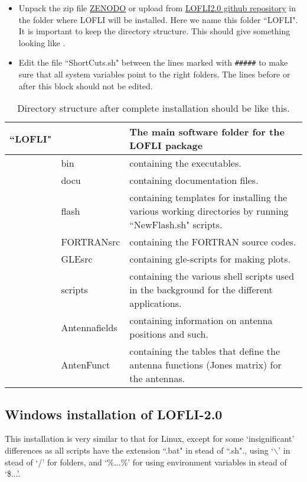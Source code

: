 \begin{itemize}
\item Unpack the zip file  \href{https://zenodo.org/records/7393903}{ZENODO} or upload from  \href{https://github.com/OlafScholten/LOFLI/tree/LOFLI2.0}{LOFLI2.0 github repository} in the folder where LOFLI will be installed. Here we name this folder ``LOFLI". It is important to keep the directory structure. This should give something looking like .
\item Edit the file ``ShortCuts.sh" between the lines marked with {\small \verb!#####! } to make sure that all system variables point to the right folders. The lines before or after this block should not be edited.
\end{itemize}

\begin{table}[!ht]
\caption{Directory structure after complete installation should be like this. }
\begin{tabular}{|l l | p{10cm}|}
\hline
{``LOFLI"} & &\multicolumn{1}{|l||}{The main software folder for the LOFLI package} \\
\hline
   & bin & containing the executables. \\
   & docu &  containing documentation files. \\
   & flash & containing templates for installing the various working directories by running ``NewFlash.sh" scripts. \\
   & FORTRANsrc & containing the FORTRAN source codes. \\
   & GLEsrc &  containing gle-scripts for making plots. \\
   & scripts & containing the various shell scripts used in the background for the different applications. \\
   & Antennafields & containing information on antenna positions and such. \\
   & AntenFunct & containing the tables that define the antenna functions (Jones matrix) for the antennas. \\
\hline
\end{tabular}
\end{table}

\subsection{Windows installation of LOFLI-2.0}

This installation is very similar to that for Linux, except for some `insignificant' differences as all scripts have the extension ``.bat" in stead of ``.sh"., using `$\backslash$' in stead of `/' for folders, and `\%...\%' for using environment variables in stead of `\${...}'. 

